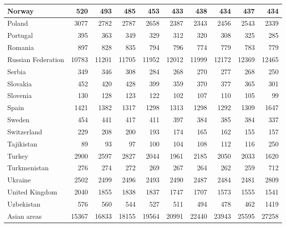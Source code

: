 \begin{table}
\begin{tabular}{|l|r|r|r|r|r|r|r|r|r|}
                        Norway&    520&    493&    485&    453&    433&    438&    434&    437&    434\\\hline
                        Poland&   3077&   2782&   2787&   2658&   2387&   2343&   2456&   2543&   2339\\\hline
                      Portugal&    395&    363&    349&    329&    312&    320&    308&    325&    285\\\hline
                       Romania&    897&    828&    835&    794&    796&    774&    779&    783&    779\\\hline
            Russian Federation&  10783&  11201&  11705&  11952&  12012&  11999&  12172&  12369&  12465\\\hline
                        Serbia&    349&    346&    308&    284&    268&    270&    277&    268&    250\\\hline
                      Slovakia&    452&    420&    428&    399&    359&    370&    377&    365&    301\\\hline
                      Slovenia&    130&    128&    123&    122&    102&    107&    110&    105&     99\\\hline
                         Spain&   1421&   1382&   1317&   1298&   1313&   1298&   1292&   1309&   1647\\\hline
                        Sweden&    454&    441&    417&    411&    397&    384&    385&    384&    337\\\hline
                   Switzerland&    229&    208&    200&    193&    174&    165&    162&    155&    157\\\hline
                    Tajikistan&     89&     93&     97&    100&    104&    108&    112&    116&    250\\\hline
                        Turkey&   2900&   2597&   2827&   2044&   1961&   2185&   2050&   2033&   1620\\\hline
                  Turkmenistan&    276&    274&    272&    269&    267&    264&    262&    259&    712\\\hline
                       Ukraine&   2502&   2499&   2496&   2493&   2490&   2487&   2484&   2481&   2809\\\hline
                United Kingdom&   2040&   1855&   1838&   1837&   1747&   1707&   1573&   1555&   1541\\\hline
                    Uzbekistan&    576&    560&    544&    527&    511&    494&    478&    462&   1419\\\hline
                   Asian areas&  15367&  16833&  18155&  19564&  20991&  22440&  23943&  25595&  27258\\\hline

\end{tabular}
\end{table}
